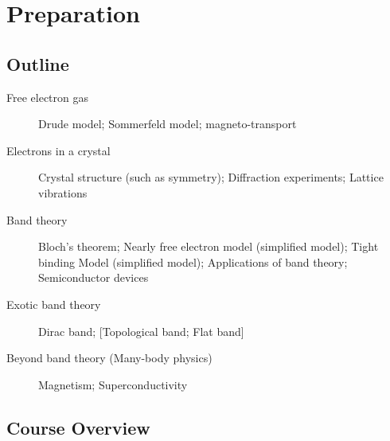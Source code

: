 
\chapter{Preparation}

\section{Outline}

\begin{description}
  \item [Free electron gas]
  Drude model; Sommerfeld model; magneto-transport
  \item [Electrons in a crystal]
  Crystal structure (such as symmetry); Diffraction experiments; Lattice vibrations
  \item [Band theory]
  Bloch's theorem; Nearly free electron model (simplified model); Tight binding Model (simplified model); Applications of band theory; Semiconductor devices
  \item [Exotic band theory]
  Dirac band; [Topological band; Flat band]
  \item [Beyond band theory (Many-body physics)]
  Magnetism; Superconductivity
\end{description}

\section{Course Overview}

